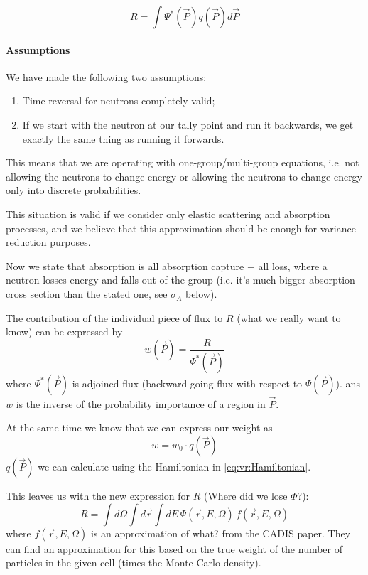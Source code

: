 \begin{equation*}
  R = \int \Psi^*(\vec{P}) q(\vec{P}) d\vec{P}
\end{equation*}

\paragraph{Assumptions}
We have made the following two assumptions:
\begin{enumerate}
\item Time reversal for neutrons completely valid;
\item If we start with the neutron at our tally point and run it backwards, we get exactly the same thing as running it forwards.
\end{enumerate}
This means that we are operating with one-group/multi-group equations,
i.e. not allowing the neutrons to change energy or allowing the neutrons to change energy only into discrete
probabilities.

This situation is valid if we consider only elastic scattering and absorption processes, and we believe that
this approximation should be enough for variance reduction purposes.

\bigskip


Now we state that absorption is all absorption capture + all loss, where a neutron losses energy and falls out of the group
(i.e. it's much bigger absorption cross section than the stated one, see $\sigma_{A}^\dagger$ below).

The contribution of the individual piece of flux to $R$ (what we really want to know) can be expressed by
\begin{equation}
  \label{eq:vr:w}
  w(\vec{P}) = \frac{R}{\Psi^*(\vec{P})}
\end{equation}
where $\Psi^*(\vec{P})$ is adjoined flux (backward going flux with respect to $\Psi(\vec{P})$).
ans $w$ is the inverse of the probability importance of a region in $\vec{P}$.

At the same time we know that we can express our weight as
\begin{equation}
  \label{eq:vr:w0}
  w = w_0 \cdot q(\vec{P})
\end{equation}
$q(\vec{P})$ we can calculate using the Hamiltonian in \eqref{eq:vr:Hamiltonian}.

This leaves us with the new expression for $R$ (\alert{Where did we lose $\Phi$?}):
\begin{equation}
  \label{eq:vr:R1}
  R = \int d\Omega \int d\vec{r} \int dE \, \Psi(\vec{r},E,\Omega) \, f(\vec{r},E,\Omega)
\end{equation}
where $f(\vec{r},E,\Omega)$ is an approximation \alert{of what?} from the CADIS paper. 
They can find an approximation for this based on the true weight of the number of particles in the given cell
(times the Monte Carlo density).

